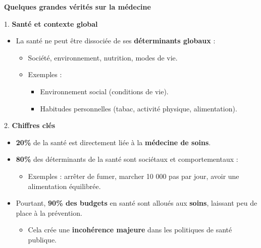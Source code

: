 \documentclass[
  ignorenonframetext,
]{beamer}
\providecommand{\tightlist}{%
  \setlength{\itemsep}{0pt}\setlength{\parskip}{0pt}}\usepackage{longtable,booktabs,array}
\begin{document}
\begin{frame}{\textbf{Quelques grandes vérités sur la médecine}}
\protect\hypertarget{quelques-grandes-vuxe9rituxe9s-sur-la-muxe9decine}{}
\begin{block}{1. \textbf{Santé et contexte global}}
\protect\hypertarget{santuxe9-et-contexte-global}{}
\begin{itemize}
\tightlist
\item
  La santé ne peut être dissociée de ses \textbf{déterminants globaux} :

  \begin{itemize}
  \tightlist
  \item
    Société, environnement, nutrition, modes de vie.
  \item
    Exemples :

    \begin{itemize}
    \tightlist
    \item
      Environnement social (conditions de vie).\\
    \item
      Habitudes personnelles (tabac, activité physique, alimentation).
    \end{itemize}
  \end{itemize}
\end{itemize}
\end{block}

\begin{block}{2. \textbf{Chiffres clés}}
\protect\hypertarget{chiffres-cluxe9s}{}
\begin{itemize}
\tightlist
\item
  \textbf{20\%} de la santé est directement liée à la \textbf{médecine
  de soins}.\\
\item
  \textbf{80\%} des déterminants de la santé sont sociétaux et
  comportementaux :

  \begin{itemize}
  \tightlist
  \item
    Exemples : arrêter de fumer, marcher 10 000 pas par jour, avoir une
    alimentation équilibrée.\\
  \end{itemize}
\item
  Pourtant, \textbf{90\% des budgets} en santé sont alloués aux
  \textbf{soins}, laissant peu de place à la prévention.

  \begin{itemize}
  \tightlist
  \item
    Cela crée une \textbf{incohérence majeure} dans les politiques de
    santé publique.
  \end{itemize}
\end{itemize}
\end{block}


\end{frame}
\end{document}
